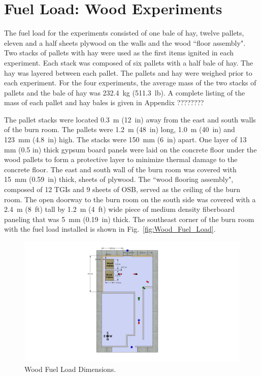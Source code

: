 \documentclass[12pt,oneside]{book}
\begin{document}
\section{Fuel Load: Wood Experiments}
\label{sec:Fuel_Load:_Wood_Experiments} 

The fuel load for the experiments consisted of one bale of hay, twelve pallets, eleven and a half sheets plywood on the walls and the wood ``floor assembly". Two stacks of pallets with hay were used as the first items ignited in each experiment.  Each stack was composed of six pallets with a half bale of hay.  The hay was layered between each pallet.  The pallets and hay were weighed prior to each experiment.  For the four experiments, the average mass of the two stacks of pallets and the bale of hay was 232.4~kg (511.3~lb).  A complete listing of the mass of each pallet and hay bales is given in Appendix ????????
  
The pallet stacks were located 0.3~m (12~in) away from the east and south walls of the burn room.  The pallets were 1.2~m (48~in) long, 1.0~m (40~in) and 123~mm (4.8~in) high.  The stacks were 150~mm (6~in) apart.  One layer of 13 mm (0.5 in) thick gypsum board panels were laid on the concrete floor under the wood pallets to form a protective layer to minimize thermal damage to the concrete floor.
The east and south wall of the burn room was covered with 15~mm (0.59~in) thick, sheets of plywood.  The ``wood flooring assembly", composed of 12 TGIs and 9 sheets of OSB, served as the ceiling of the burn room.  The open doorway to the burn room on the south side was covered with a 2.4~m (8~ft) tall by 1.2~m (4~ft) wide piece of medium density fiberboard paneling that was 5~mm (0.19~in) thick.  The southeast corner of the burn room with the fuel load installed is shown in Fig.~\ref{fig:Wood_Fuel_Load}.

\begin{figure}[!ht]
	\includegraphics[width=6in]{../Figures/Pictures/DelCoSingleStoryWoodFuelLoad}
	\caption{Wood Fuel Load Dimensions.}
	\label{fig:Wood_Fuel_Load_Dimensions}
\end{figure}
\end{document}
